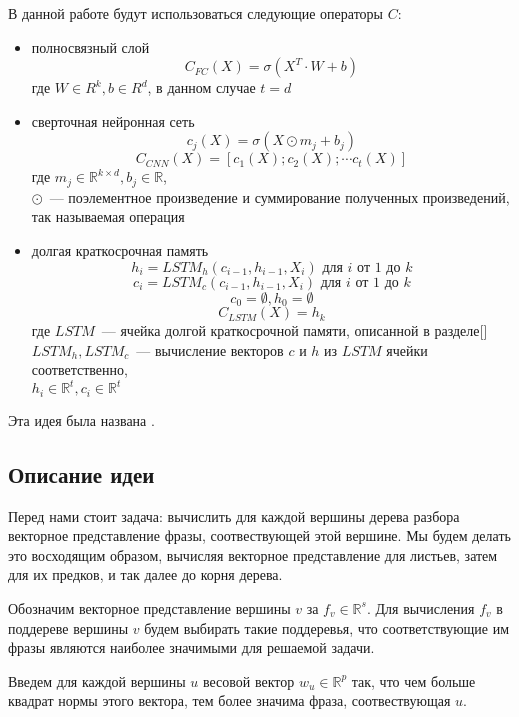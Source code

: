 \vspace{5mm}

\noindent В данной работе будут использоваться следующие операторы $C$:
\begin{itemize}
    \item{полносвязный слой}
        $$C_{FC}(X)=\sigma(X^T \cdot W + b)$$
        где $W \in R^k, b \in R^d$, в данном случае $t=d$
    \item{сверточная нейронная сеть}
        $$c_j(X)=\sigma(X \odot m_j + b_j)$$
        $$C_{CNN}(X)=[c_1(X); c_2(X); \cdots c_t(X)]$$
        где $m_j \in \mathbb{R}^{k \times d}, b_j \in \mathbb{R}$,\\
        $\odot$~--- поэлементное произведение и суммирование полученных произведений, 
        так называемая операция 
    \item{долгая краткосрочная память}
    $$h_i=LSTM_h(c_{i-1},h_{i-1}, X_i) \text{ для } i \text{ от } 1 \text { до } k$$  
    $$c_i=LSTM_c(c_{i-1}, h_{i-1}, X_i) \text{ для } i \text{ от } 1 \text { до } k$$ 
    $$c_0 = \emptyset, h_0 = \emptyset$$
    $$C_{LSTM}(X) = h_k$$
    где $LSTM$~--- ячейка долгой краткосрочной памяти, описанной в разделе[]\\
    $LSTM_h, LSTM_c$~--- вычисление векторов $c$ и $h$ из $LSTM$ ячейки соответственно,\\
    $h_i \in \mathbb{R}^t, c_i \in \mathbb{R}^t$
\end{itemize}

\noindent Эта идея была названа .

\subsection{Описание идеи } 

Перед нами стоит задача: вычислить для каждой вершины дерева разбора 
векторное представление фразы, соотвествующей этой вершине.
Мы будем делать это восходящим образом, вычисляя векторное представление для листьев,
затем для их предков, и так далее до корня дерева.

Обозначим векторное представление вершины $v$ за $f_v \in \mathbb{R}^s$.
Для вычисления $f_v$ в поддереве вершины $v$ будем выбирать такие поддеревья, 
что соответствующие им фразы являются наиболее значимыми для решаемой задачи.

Введем для каждой вершины $u$ весовой вектор $w_u \in \mathbb{R}^p$  так, что
чем больше квадрат нормы  этого вектора, тем более значима фраза, соотвествующая $u$.

